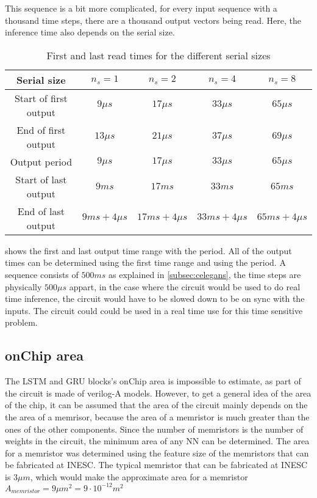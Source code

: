This sequence is a bit more complicated, for every input sequence with a thousand time steps, there are a thousand output vectors being read. Here, the inference time also depends on the serial size.

\begin{table}[H]
  \centering
  \begin{tabular}{|c|c|c|c|c|}
    \hline
    \rowcolor{gray}
    Serial size & $n_s=1$ & $n_s=2$ & $n_s=4$ & $n_s=8$\\
    \hline
    Start of first output & $9\mu s$ & $17\mu s$ & $33\mu s$ & $65\mu s$\\
    \hline
    End of first output & $13\mu s$ & $21\mu s$ & $37\mu s$ & $69\mu s$\\
    \hline
    Output period & $9\mu s$ & $17\mu s$ & $33\mu s$ & $65\mu s$\\
    \hline
    Start of last output & $9ms$ & $17ms$ & $33ms$ & $65ms$\\
    \hline
    End of last output & $9ms +4\mu s$ & $17ms+4\mu s$ & $33ms+4\mu s$ & $65ms+4\mu s$\\
    \hline
  \end{tabular}
  \caption{First and last read times for the different serial sizes}
  \label{tab:readTimesCelegans}
\end{table}

 shows the first and last output time range with the period. All of the output times can be determined using the first time range and using the period. A sequence consists of $500ms$ as explained in \cref{subsec:celegans}, the time steps are physically $500\mu s$ appart, in the case where the circuit would be used to do real time inference, the circuit would have to be slowed down to be on sync with the inputs. The circuit could could be used in a real time use for this time sensitive problem.

\subsection{onChip area}\label{subsec:area}

The \ac{LSTM} and \ac{GRU} blocks's onChip area is impossible to estimate, as part of the circuit is made of verilog-A models. However, to get a general idea of the area of the chip, it can be assumed that the area of the circuit mainly depends on the the area of a memrisor, because the area of a memristor is much greater than the ones of the other components. Since the number of memristors is the number of weights in the circuit, the minimum area of any \ac{NN} can be determined. The area for a memristor was determined using the feature size of the memristors that can be fabricated at \ac{INESC}. The typical memristor that can be fabricated at \ac{INESC} is $3\mu m$, which would make the approximate area for a memristor $A_{memristor}=9\mu m^2=9\cdot 10^{-12} m^2$

